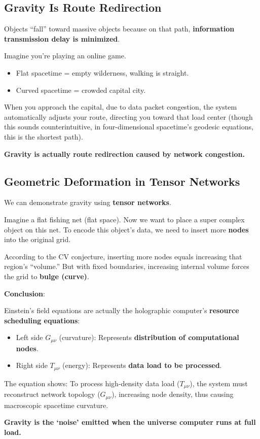 \subsection{Gravity Is Route Redirection}

Objects ``fall'' toward massive objects because on that path, \textbf{information transmission delay is minimized}.

Imagine you're playing an online game.
\begin{itemize}
\item Flat spacetime = empty wilderness, walking is straight.
\item Curved spacetime = crowded capital city.
\end{itemize}

When you approach the capital, due to data packet congestion, the system automatically adjusts your route, directing you toward that load center (though this sounds counterintuitive, in four-dimensional spacetime's geodesic equations, this is the shortest path).

\textbf{Gravity is actually route redirection caused by network congestion.}

\subsection{Geometric Deformation in Tensor Networks}

We can demonstrate gravity using \textbf{tensor networks}.

Imagine a flat fishing net (flat space).
Now we want to place a super complex object on this net. To encode this object's data, we need to insert more \textbf{nodes} into the original grid.

According to the CV conjecture, inserting more nodes equals increasing that region's ``volume.'' But with fixed boundaries, increasing internal volume forces the grid to \textbf{bulge (curve)}.

\textbf{Conclusion}:

Einstein's field equations are actually the holographic computer's \textbf{resource scheduling equations}:
\begin{itemize}
\item Left side $G_{\mu\nu}$ (curvature): Represents \textbf{distribution of computational nodes}.
\item Right side $T_{\mu\nu}$ (energy): Represents \textbf{data load to be processed}.
\end{itemize}

The equation shows: To process high-density data load ($T_{\mu\nu}$), the system must reconstruct network topology ($G_{\mu\nu}$), increasing node density, thus causing macroscopic spacetime curvature.

\textbf{Gravity is the `noise' emitted when the universe computer runs at full load.}

